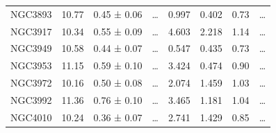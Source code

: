 \documentclass[reprint,%
 amsmath,amssymb,
 aps,
]{revtex4-1}
\begin{document}
\begin{table}[]
\begin{tabular}{cccccrrc}
\rowcolor[HTML]{F3F3F3} 
NGC3893              & 10.77                     & 0.45 ± 0.06           & …                      & 0.997                                                        & 0.402                                                        & 0.73                                                       & …                                                             \\
\rowcolor[HTML]{F3F3F3} 
NGC3917              & 10.34                     & 0.55 ± 0.09           & …                      & 4.603                                                        & 2.218                                                           & 1.14                                                          & …                                                             \\
\rowcolor[HTML]{F3F3F3} 
NGC3949              & 10.58                     & 0.44 ± 0.07           & …                      & 0.547                                                        & 0.435                                                         & 0.73                                                          & …                                                             \\
\rowcolor[HTML]{F3F3F3} 
NGC3953              & 11.15                     & 0.59 ± 0.10           & …                      & 3.424                                                        & 0.474                                                       & 0.90                                                          & …                                                             \\
\rowcolor[HTML]{F3F3F3} 
NGC3972              & 10.16                     & 0.50 ± 0.08           & …                      & 2.074                                                        & 1.459                                                          & 1.03                                                           & …                                                             \\
\rowcolor[HTML]{F3F3F3} 
NGC3992              & 11.36                     & 0.76 ± 0.10           & …                      & 3.465                                                        & 1.181                                                         & 1.04                                                          & …                                                             \\
\rowcolor[HTML]{F3F3F3} 
NGC4010              & 10.24                     & 0.36 ± 0.07           & …                      & 2.741                                                        & 1.429                                                         & 0.85                                                         & …                                                             \\

\end{tabular}
\end{table}
\end{document}
